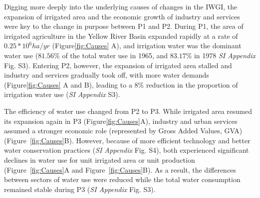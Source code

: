 Digging more deeply into the underlying causes of changes in the IWGI, the expansion of irrigated area and the economic growth of industry and services were key to the change in purpose between P1 and P2.
During P1, the area of irrigated agriculture in the Yellow River Basin expanded rapidly at a rate of $0.25*10^6 ha/yr$ (Figure\ref{fig:Causes} A), and irrigation water was the dominant water use ($81.56\%$ of the total water use in 1965, and $83.17\%$ in 1978 \textit{SI Appendix} Fig. S3).
Entering P2, however, the expansion of irrigated area stalled and industry and services gradually took off, with more water demands (Figure\ref{fig:Causes} A and B), leading to a $8\%$ reduction in the proportion of irrigation water use (\textit{SI Appendix} S3).

The efficiency of water use changed from P2 to P3.
While irrigated area resumed its expansion again in P3 (Figure\ref{fig:Causes}A), industry and urban services assumed a stronger economic role (represented by Gross Added Values, GVA) (Figure~\ref{fig:Causes}B).
However, because of more efficient technology and better water conservation practices (\textit{SI Appendix} Fig. S4), both experienced significant declines in water use for unit irrigated area or unit production (Figure~\ref{fig:Causes}A and Figure~\ref{fig:Causes}B).
As a result, the differences between sectors of water use were reduced while the total water consumption remained stable during P3 (\textit{SI Appendix} Fig. S3).

